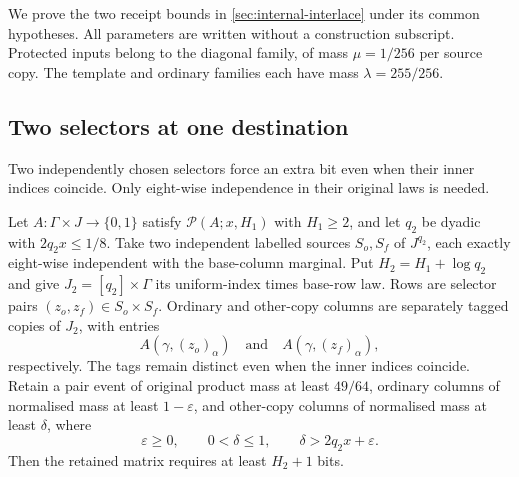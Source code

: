 \documentclass[11pt]{article} \usepackage[utf8]{inputenc}
\theoremstyle{plain} \newtheorem{theorem}{Theorem}[section]
\theoremstyle{definition} \newaliascnt{definition}{theorem}
\newcommand{\RP}[3]{\mathcal{P}(#1;#2,#3)}
\begin{document}
We prove the two receipt bounds in \cref{sec:internal-interlace} under its common
hypotheses. All parameters are written without a construction subscript.
Protected inputs belong to the diagonal family, of mass $\mu=1/256$ per source
copy. The template and ordinary families each have mass $\lambda=255/256$.

\subsection{Two selectors at one destination}

Two independently chosen selectors force an extra bit even when their inner
indices coincide. Only eight-wise independence in their original laws is needed.

\begin{lemma}\label{res:paired}
Let $A:\Gamma\times J\to\{0,1\}$ satisfy $\RP{A}{x}{H_1}$ with $H_1\ge2$,
and let $q_2$ be dyadic with $2q_2x\le1/8$. Take two independent labelled
sources $S_o,S_f$ of $J^{q_2}$, each exactly eight-wise independent with the
base-column marginal. Put $H_2=H_1+\log q_2$ and give
$J_2=[q_2]\times\Gamma$ its uniform-index times base-row law.
Rows are selector pairs $(z_o,z_f)\in S_o\times S_f$. Ordinary and
other-copy columns are separately tagged copies of $J_2$, with entries
\[
A(\gamma,(z_o)_\alpha)\quad\text{and}\quad
A(\gamma,(z_f)_\alpha),
\]
respectively. The tags remain distinct even when the inner indices coincide.
Retain a pair event of original product mass at least $49/64$, ordinary columns
of normalised mass at least $1-\varepsilon$, and other-copy columns of
normalised mass at least $\delta$, where
\[
\varepsilon\ge0,\qquad 0<\delta\le1,\qquad
\delta>2q_2x+\varepsilon.
\]
Then the retained matrix requires at least $H_2+1$ bits.
\end{lemma}
\end{document}
